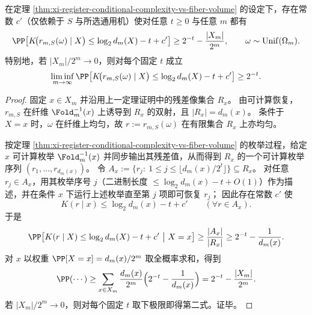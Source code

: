 \begin{theorem}\label{thm:xi-register-conditional-complexity-tail-sharpness}
在定理 \ref{thm:xi-register-conditional-complexity-vs-fiber-volume} 的设定下，存在常数 \(c'\)（仅依赖于 \(S\) 与所选通用机）使对任意 \(t\ge 0\) 与任意 \(m\) 都有
\[
\PP\!\left[
K\!\bigl(r_{m,S}(\omega)\mid X\bigr)\le \log_2 d_m(X)-t+c'
\right]
\ge
2^{-t}-\frac{|X_m|}{2^m},
\qquad \omega\sim\mathrm{Unif}(\Omega_m).
\]
特别地，若 \(|X_m|/2^m\to 0\)，则对每个固定 \(t\) 成立
\[
\liminf_{m\to\infty}
\PP\!\left[
K\!\bigl(r_{m,S}(\omega)\mid X\bigr)\le \log_2 d_m(X)-t+c'
\right]
\ge 2^{-t}.
\]
\end{theorem}
\begin{proof}
固定 \(x\in X_m\) 并沿用上一定理证明中的残差像集合 \(R_x\)。
由可计算恢复，\(r_{m,S}\) 在纤维 \(\Fold_m^{-1}(x)\) 上诱导到 \(R_x\) 的双射，且 \(|R_x|=d_m(x)\)。
条件于 \(X=x\) 时，\(\omega\) 在纤维上均匀，故 \(r:=r_{m,S}(\omega)\) 在有限集合 \(R_x\) 上亦均匀。

按定理 \ref{thm:xi-register-conditional-complexity-vs-fiber-volume} 的枚举过程，给定 \(x\) 可计算枚举 \(\Fold_m^{-1}(x)\) 并同步输出其残差值，从而得到 \(R_x\) 的一个可计算枚举序列 \((r_1,\dots,r_{d_m(x)})\)。
令
\(
A_x:=\{r_j:\ 1\le j\le \lfloor d_m(x)/2^t\rfloor\}\subseteq R_x
\)。
对任意 \(r_j\in A_x\)，用其枚举序号 \(j\)（二进制长度 \(\le \log_2 d_m(x)-t+O(1)\)）作为描述，并在条件 \(x\) 下运行上述枚举直至第 \(j\) 项即可恢复 \(r_j\)；
因此存在常数 \(c'\) 使
\[
K(r\mid x)\le \log_2 d_m(x)-t+c'\qquad(\forall r\in A_x).
\]
于是
\[
\PP\!\left[K(r\mid X)\le \log_2 d_m(X)-t+c'\ \big|\ X=x\right]
\ge \frac{|A_x|}{|R_x|}
\ge 2^{-t}-\frac1{d_m(x)}.
\]
对 \(x\) 以权重 \(\PP[X=x]=d_m(x)/2^m\) 取全概率求和，得到
\[
\PP(\cdots)\ge \sum_{x\in X_m}\frac{d_m(x)}{2^m}\Bigl(2^{-t}-\frac1{d_m(x)}\Bigr)
=2^{-t}-\frac{|X_m|}{2^m}.
\]
若 \(|X_m|/2^m\to 0\)，则对每个固定 \(t\) 取下极限即得第二式。证毕。
\end{proof}

